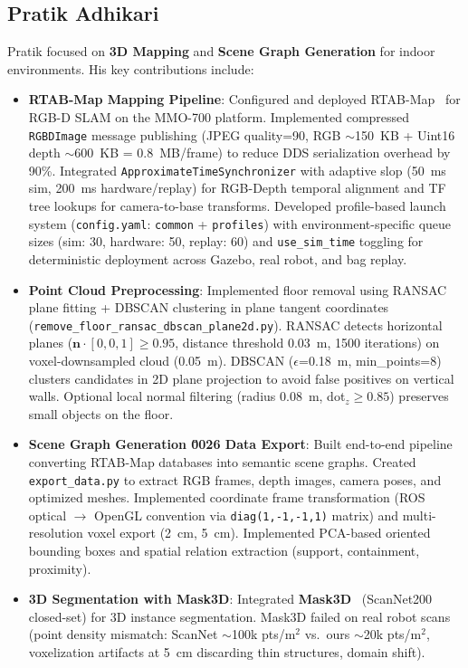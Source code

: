 \documentclass[12pt,oneside,a4paper]{article}
\begin{document}
\subsection{Pratik Adhikari}
Pratik focused on \textbf{3D Mapping} and \textbf{Scene Graph Generation} for indoor environments. His key contributions include:
\begin{itemize}
    \item \textbf{RTAB-Map Mapping Pipeline}: Configured and deployed RTAB-Map~\cite{labbe2013rtabmap} for RGB-D SLAM on the MMO-700 platform. Implemented compressed \texttt{RGBDImage} message publishing (JPEG quality=90, RGB $\sim$150~KB + Uint16 depth $\sim$600~KB = 0.8~MB/frame) to reduce DDS serialization overhead by 90\%. Integrated \texttt{ApproximateTimeSynchronizer} with adaptive slop (50~ms sim, 200~ms hardware/replay) for RGB-Depth temporal alignment and TF tree lookups for camera-to-base transforms. Developed profile-based launch system (\texttt{config.yaml}: \texttt{common} + \texttt{profiles}) with environment-specific queue sizes (sim: 30, hardware: 50, replay: 60) and \texttt{use\_sim\_time} toggling for deterministic deployment across Gazebo, real robot, and bag replay.
    
    \item \textbf{Point Cloud Preprocessing}: Implemented floor removal using RANSAC plane fitting + DBSCAN clustering in plane tangent coordinates (\texttt{remove\_floor\_ransac\_dbscan\_plane2d.py}). RANSAC detects horizontal planes ($\mathbf{n} \cdot [0,0,1] \geq 0.95$, distance threshold 0.03~m, 1500 iterations) on voxel-downsampled cloud (0.05~m). DBSCAN ($\epsilon$=0.18~m, min\_points=8) clusters candidates in 2D plane projection to avoid false positives on vertical walls. Optional local normal filtering (radius 0.08~m, dot$_z \geq 0.85$) preserves small objects on the floor.
    
    \item \textbf{Scene Graph Generation \u0026 Data Export}: Built end-to-end pipeline converting RTAB-Map databases into semantic scene graphs. Created \texttt{export\_data.py} to extract RGB frames, depth images, camera poses, and optimized meshes. Implemented coordinate frame transformation (ROS optical $\to$ OpenGL convention via \texttt{diag(1,-1,-1,1)} matrix) and multi-resolution voxel export (2~cm, 5~cm). Implemented PCA-based oriented bounding boxes and spatial relation extraction (support, containment, proximity).
    
    \item \textbf{3D Segmentation with Mask3D}: Integrated \textbf{Mask3D}~\cite{schult2023mask3d} (ScanNet200 closed-set) for 3D instance segmentation. Mask3D failed on real robot scans (point density mismatch: ScanNet $\sim$100k pts/m$^2$ vs.\ ours $\sim$20k pts/m$^2$, voxelization artifacts at 5~cm discarding thin structures, domain shift).
    

\end{itemize}
\end{document}
